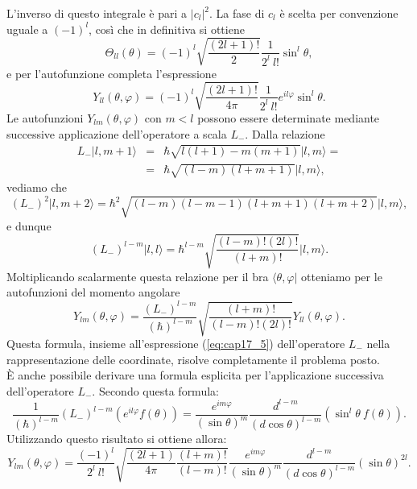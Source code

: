 \documentclass[a4paper,12pt,oneside]{book}
\begin{document}
L'inverso di questo integrale è pari a $\vert c_l \vert ^2$. La fase di $c_l$ è scelta per convenzione uguale a $(-1)^l$, così che in definitiva si ottiene
\begin{equation}
\Theta _{ll} (\theta ) = (-1)^l \sqrt{\frac{(2l+1)!}{2}}\frac{1}{2^l\ l!}\sin^l \theta ,
\end{equation}
e per l'autofunzione completa l'espressione
\begin{equation}
Y_{ll} (\theta , \varphi) = (-1)^l \sqrt{\frac{(2l+1)!}{4\pi}}\frac{1}{2^l\ l!}e^{il\varphi} \sin ^l \theta  .
\end{equation}
Le autofunzioni $Y_{lm}(\theta , \varphi)$ con $m<l$ possono essere determinate mediante successive applicazione dell'operatore a scala $L_-$. Dalla relazione
\begin{eqnarray}
L_-\vert l, m+1 \rangle &=& \hbar \sqrt{l(l+1) - m(m+1)} \vert l,m \rangle = \nonumber \\
&=& \hbar \sqrt{(l-m)(l+m+1)} \vert l,m \rangle ,
\end{eqnarray}
vediamo che 
\begin{equation}
(L_-)^2 \vert l, m+2 \rangle = \hbar ^2 \sqrt{(l-m)(l-m-1)(l+m+1)(l+m+2)}\vert l,m \rangle ,
\end{equation}
e dunque
\begin{equation}
(L_-)^{l-m} \vert l, l \rangle = \hbar ^{l-m} \sqrt{\frac{(l-m)!(2l)!}{(l+m)!}}\vert l,m \rangle .
\end{equation}
Moltiplicando scalarmente questa relazione per il bra $\langle \theta , \varphi \vert $ otteniamo per le autofunzioni del momento angolare
\begin{equation}
Y_{lm} (\theta ,  \varphi ) = \frac{(L_-)^{l-m}}{(\hbar )^{l-m}}\sqrt{\frac{(l+m)!}{(l-m)!(2l)!}} Y_{ll} (\theta , \varphi) . 
\end{equation}
Questa formula, insieme all'espressione (\ref{eq:cap17_5}) dell'operatore $L_-$ nella rappresentazione delle coordinate, risolve completamente il problema posto.\\
È anche possibile derivare una formula esplicita per l'applicazione successiva dell'operatore $L_-$. Secondo questa formula:
\begin{equation}
\frac{1}{(\hbar) ^{l-m}}(L_-)^{l-m} \left( e^{il\varphi} f(\theta) \right) = \frac{e^{im\varphi}}{(\sin \theta ) ^m} \frac{d^{l-m}}{(d\cos \theta )^{l-m}}\left( \sin ^l \theta \ f(\theta ) \right).
\end{equation}
Utilizzando questo risultato si ottiene allora:
\begin{equation}
Y_{lm} (\theta ,  \varphi ) = \frac{(-1)^{l}}{2^l\ l!}\sqrt{\frac{(2l+1)}{4\pi}\frac{(l+m)!}{(l-m)!}}  \frac{e^{im\varphi}}{(\sin \theta ) ^m} \frac{d^{l-m}}{(d\cos \theta )^{l-m}}\left( \sin  \theta \right) ^{2l}.
\end{equation}
\end{document}
